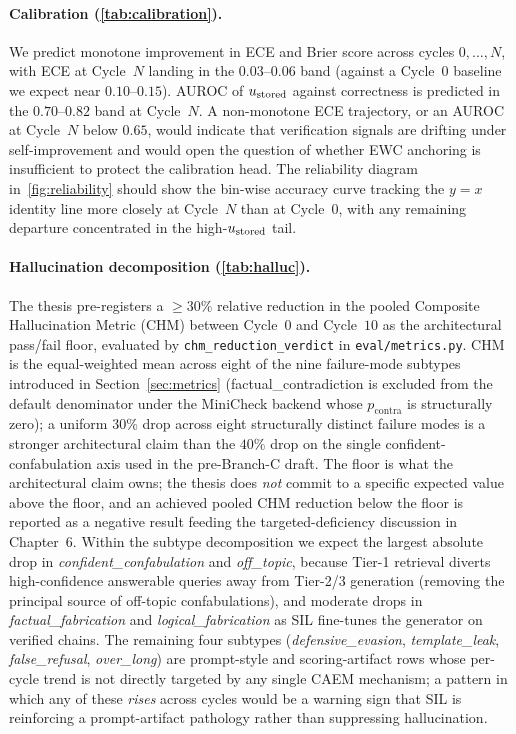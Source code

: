 \paragraph{Calibration (\cref{tab:calibration}).}
We predict monotone improvement in ECE and Brier score across cycles
$0,\ldots,N$, with ECE at Cycle~$N$ landing in the $0.03$--$0.06$
band (against a Cycle~$0$ baseline we expect near $0.10$--$0.15$).
AUROC of $u_{\text{stored}}$ against correctness is predicted in the
$0.70$--$0.82$ band at Cycle~$N$. A non-monotone ECE trajectory, or
an AUROC at Cycle~$N$ below $0.65$, would indicate that verification
signals are drifting under self-improvement and would open the
question of whether EWC anchoring is insufficient to protect the
calibration head. The reliability diagram in~\cref{fig:reliability}
should show the bin-wise accuracy curve tracking the $y = x$ identity
line more closely at Cycle~$N$ than at Cycle~$0$, with any remaining
departure concentrated in the high-$u_{\text{stored}}$ tail.

\paragraph{Hallucination decomposition (\cref{tab:halluc}).}
The thesis pre-registers a $\geq 30\%$ relative reduction in the pooled Composite Hallucination Metric (CHM) between Cycle~$0$ and Cycle~$10$ as the architectural pass/fail floor, evaluated by \texttt{chm\_reduction\_verdict} in \texttt{eval/metrics.py}. CHM is the equal-weighted mean across eight of the nine failure-mode subtypes introduced in Section~\ref{sec:metrics} (factual\_contradiction is excluded from the default denominator under the MiniCheck backend whose $p_{\text{contra}}$ is structurally zero); a uniform $30\%$ drop across eight structurally distinct failure modes is a stronger architectural claim than the $40\%$ drop on the single confident-confabulation axis used in the pre-Branch-C draft. The floor is what the architectural claim owns; the thesis does \emph{not} commit to a specific expected value above the floor, and an achieved pooled CHM reduction below the floor is reported as a negative result feeding the targeted-deficiency discussion in Chapter~6. Within the subtype decomposition we expect the largest absolute drop in \emph{confident\_confabulation} and \emph{off\_topic}, because Tier-1 retrieval diverts high-confidence answerable queries away from Tier-2/3 generation (removing the principal source of off-topic confabulations), and moderate drops in \emph{factual\_fabrication} and \emph{logical\_fabrication} as SIL fine-tunes the generator on verified chains. The remaining four subtypes (\emph{defensive\_evasion}, \emph{template\_leak}, \emph{false\_refusal}, \emph{over\_long}) are prompt-style and scoring-artifact rows whose per-cycle trend is not directly targeted by any single CAEM mechanism; a pattern in which any of these \emph{rises} across cycles would be a warning sign that SIL is reinforcing a prompt-artifact pathology rather than suppressing hallucination.

